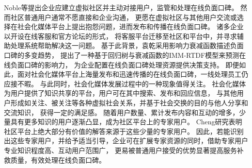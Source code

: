 Noble等\cite{noble2012let}提出企业应建立虚拟社区并主动对接用户，监管和处理在线负面口碑。
然而社区普通用户通常不愿直接和企业沟通，
更愿在虚拟社区与其他用户交流或选择在社会化媒体平台上提出抱怨问题，进而发布和传播在线负面口碑。
诸多企业以开设在线客服和官方论坛的形式，
将客服平台迁移至社区和平台中，并寻求辅助处理系统帮助解决这一问题。
基于此背景，袁乾\cite{cai2016}采用影响力衰减函数描述负面口碑的多变趋势，
提出了一种基于回归树与衰减函数的IMM-RTDF模型来预测在线负面口碑的影响力，
为企业配置在线负面口碑处理资源提供决策支持。
即便如此，面对社会化媒体平台上海量发布和迅速传播的在线负面口碑，一线处理员工仍应接不暇。
与此同时，社会化媒体发展过程中的一种现象值得关注。
社会化媒体为用户提供了知识共享的平台，用户可在其中搜索、发布和回应信息，
与其他用户形成如关注、被关注等各种虚拟社会关系，并基于社会交换的目的与他人分享和交流知识，
获得一定的满足感。
随着用户数量、累计发布内容和互动的增多，少量具有更多知识的用户逐渐凸显，成为社区平台上的专家用户。
Cheng\cite{cheng2015exploiting}研究表明社区平台上绝大部分有价值的解答来源于这些少量的专家用户。
因此，若能识别出这些专家用户，并给予适当引导，企业可在扩展专家资源的同时，借助专家用户专业知识程度高、互动用户范围广，
更易被普通用户接受的优势显著提高服务补救质量，有效处理在线负面口碑。